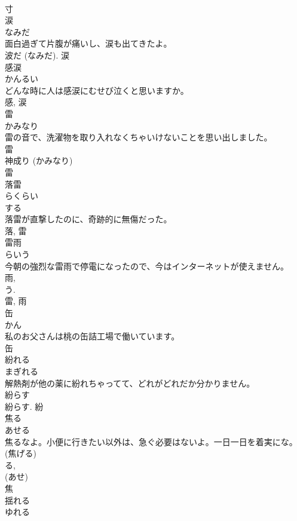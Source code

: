 \documentclass[8pt]{extreport}
\begin{document}
\begin{CJK}{UTF8}{min}
\\	寸	
\\	涙	
\\	なみだ	
\\	面白過ぎて片腹が痛いし、涙も出てきたよ。	
\\	波だ (なみだ).	涙	
\\	感涙	
\\	かんるい	
\\	どんな時に人は感涙にむせび泣くと思いますか。	
\\	感, 涙	
\\	雷	
\\	かみなり	
\\	雷の音で、洗濯物を取り入れなくちゃいけないことを思い出しました。	
\\	雷 
\\	神成り (かみなり) 
\\	雷	
\\	落雷	
\\	らくらい	
\\	する 
\\	落雷が直撃したのに、奇跡的に無傷だった。	
\\	落, 雷	
\\	雷雨	
\\	らいう	
\\	今朝の強烈な雷雨で停電になったので、今はインターネットが使えません。	
\\	雨, 
\\	う. 
\\	雷, 雨	
\\	缶	
\\	かん	
\\	私のお父さんは桃の缶詰工場で働いています。	
\\	缶	
\\	紛れる	
\\	まぎれる	
\\	解熱剤が他の薬に紛れちゃってて、どれがどれだか分かりません。	
\\	紛らす 
\\	紛らす.	紛	
\\	焦る	
\\	あせる	
\\	焦るなよ。小便に行きたい以外は、急ぐ必要はないよ。一日一日を着実にな。	
\\	(焦げる) 
\\	る, 
\\	(あせ) 
\\	焦	
\\	揺れる	
\\	ゆれる	

\end{CJK}
\end{document}
